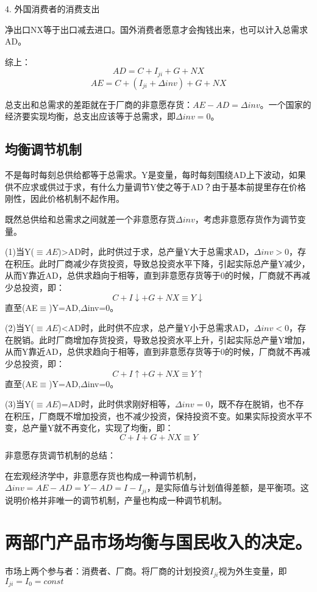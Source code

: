\documentclass{article}
\begin{document}
4. 外国消费者的消费支出

净出口NX等于出口减去进口。国外消费者愿意才会掏钱出来，也可以计入总需求AD。

\hspace*{\fill}

综上：
\[
AD=C+I_{ji}+G+NX
\]
\[
AE=C+(I_{ji}+\Delta inv)+G+NX
\]

总支出和总需求的差距就在于厂商的非意愿存货：$ AE-AD=\Delta inv $。一个国家的经济要实现均衡，总支出应该等于总需求，即$ \Delta inv=0 $。

\subsection{均衡调节机制}
不是每时每刻总供给都等于总需求。Y是变量，每时每刻围绕AD上下波动，如果供不应求或供过于求，有什么力量调节Y使之等于AD？由于基本前提里存在价格刚性，因此价格机制不起作用。


既然总供给和总需求之间就差一个非意愿存货$ \Delta inv $，考虑非意愿存货作为调节变量。

\hspace*{\fill}

(1)当Y($ \equiv AE $)>AD时，此时供过于求，总产量Y大于总需求AD，$ \Delta inv>0 $，存在积压。此时厂商减少存货投资，导致总投资水平下降，引起实际总产量Y减少，从而Y靠近AD，总供求趋向于相等，直到非意愿存货等于0的时候，厂商就不再减少总投资，即：
\[
C+I\downarrow+G+NX\equiv Y\downarrow
\]
直至(AE$ \equiv $)Y=AD,$ \Delta $inv=0。

(2)当Y($ \equiv AE $)<AD时，此时供不应求，总产量Y小于总需求AD，$ \Delta inv<0$，存在脱销。此时厂商增加存货投资，导致总投资水平上升，引起实际总产量Y增加，从而Y靠近AD，总供求趋向于相等，直到非意愿存货等于0的时候，厂商就不再减少总投资，即：
\[
C+I\uparrow+G+NX\equiv Y\uparrow
\]
直至(AE$ \equiv $)Y=AD,$ \Delta $inv=0。

(3)当Y($ \equiv AE $)=AD时，此时供求刚好相等，$ \Delta inv=0 $，既不存在脱销，也不存在积压，厂商既不增加投资，也不减少投资，保持投资不变。如果实际投资水平不变，总产量Y就不再变化，实现了均衡，即：
\[
C+I+G+NX\equiv Y
\]

非意愿存货调节机制的总结：

在宏观经济学中，非意愿存货也构成一种调节机制，$ \Delta inv=AE-AD=Y-AD=I-I_{ji} $，是实际值与计划值得差额，是平衡项。这说明价格并非唯一的调节机制，产量也构成一种调节机制。

\section{两部门产品市场均衡与国民收入的决定。}
市场上两个参与者：消费者、厂商。将厂商的计划投资$ I_{ji} $视为外生变量，即$ I_{ji}=I_0=const $
\end{document}
